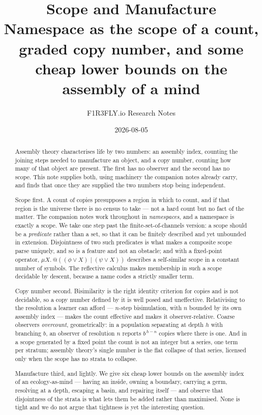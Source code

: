 \documentclass[11pt]{article}
\title{\textbf{Scope and Manufacture}\\[4pt]
\large Namespace as the scope of a count, graded copy number, and some
cheap lower bounds on the assembly of a mind}
\author{F1R3FLY.io Research Notes}
\date{2026-08-05}
\makeatletter
\theoremstyle{plain}
\theoremstyle{definition}
\theoremstyle{remark}
\newcommand{\quo}[1]{@#1}
\makeatother
\begin{document}
\maketitle

\begin{abstract}
\noindent
Assembly theory characterises life by two numbers: an assembly index,
counting the joining steps needed to manufacture an object, and a copy
number, counting how many of that object are present. The first has no
observer and the second has no scope. This note supplies both, using
machinery the companion notes already carry, and finds that once they are
supplied the two numbers stop being independent.

Scope first. A count of copies presupposes a region in which to count, and
if that region is the universe there is no census to take --- not a hard
count but no fact of the matter. The companion notes work throughout in
\emph{namespaces}, and a namespace is exactly a scope. We take one step
past the finite-set-of-channels version: a scope should be a
\emph{predicate} rather than a set, so that it can be finitely described
and yet unbounded in extension. Disjointness of two such predicates is what
makes a composite scope parse uniquely, and so is a feature and not an
obstacle; and with a fixed-point operator, $\mu X.\,\quo{((\phi \lor X)
\mid (\psi \lor X))}$ describes a self-similar scope in a constant number
of symbols. The reflective calculus makes membership in such a scope
decidable by descent, because a name codes a strictly smaller term.

Copy number second. Bisimilarity is the right identity criterion for
copies and is not decidable, so a copy number defined by it is well posed
and uneffective. Relativising to the resolution a learner can afford ---
$n$-step bisimulation, with $n$ bounded by its own assembly index ---
makes the count effective and makes it observer-relative. Coarse observers
\emph{overcount}, geometrically: in a population separating at depth $h$
with branching $b$, an observer of resolution $n$ reports $b^{\,h-n}$
copies where there is one. And in a scope generated by a fixed point the
count is not an integer but a series, one term per stratum; assembly
theory's single number is the flat collapse of that series, licensed only
when the scope has no strata to collapse.

Manufacture third, and lightly. We give six cheap lower bounds on the
assembly index of an ecology-as-mind --- having an inside, owning a
boundary, carrying a germ, resolving at a depth, escaping a basin, and
repairing itself --- and observe that disjointness of the strata is what
lets them be added rather than maximised. None is tight and we do not
argue that tightness is yet the interesting question.


\end{abstract}
\end{document}
